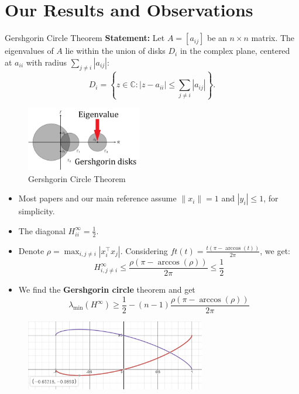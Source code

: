 \documentclass[serif, aspectratio=169]{beamer}
\begin{document}
\section{Our Results and Observations}


\begin{frame}{Gershgorin Circle Theorem}
	\textbf{Statement:} Let \( A = [a_{ij}] \) be an \( n \times n \) matrix. The eigenvalues of \( A \) lie within the union of disks \( D_i \) in the complex plane, centered at \( a_{ii} \) with radius \( \sum_{j \neq i} |a_{ij}| \):
	\[
	D_i = \left\{ z \in \mathbb{C} : |z - a_{ii}| \leq \sum_{j \neq i} |a_{ij}| \right\}.
	\]


    \begin{figure}
		\centering
		\includegraphics[width=0.45\textwidth]{pic/gresh.jpg}
		\caption{Gershgorin Circle Theorem}
	\end{figure}
\end{frame}


\begin{frame}
	\begin{itemize}
		\item Most papers and our main reference assume \(\|x_i\|=1\) and \(|y_i|\leq 1\), for simplicity.
		\item The diagonal \(H^\infty_{ii} = \frac{1}{2}\).
		\item Denote \(\rho = \max_{i,j\neq i} |x_i^\top x_j| \). Considering \(ft(t)=\frac{t(\pi-\arccos(t))}{2\pi}\), we get:
		\[
		H^\infty_{i,j\neq i} \leq \frac{\rho(\pi-\arccos(\rho))}{2\pi} \leq \frac{1}{2}
		\]
		\item We find the \textbf{Gershgorin circle} theorem and get
		\[
		 \lambda_{\min}(H^\infty) \geq  \frac{1}{2} - (n-1)\frac{\rho(\pi-\arccos(\rho))}{2\pi}
		\]
	\end{itemize}
	\begin{figure}
		\includegraphics[width=0.7\textwidth]{pic/Arc-Cos-Func.jpg}
	\end{figure}
\end{frame}
\end{document}
